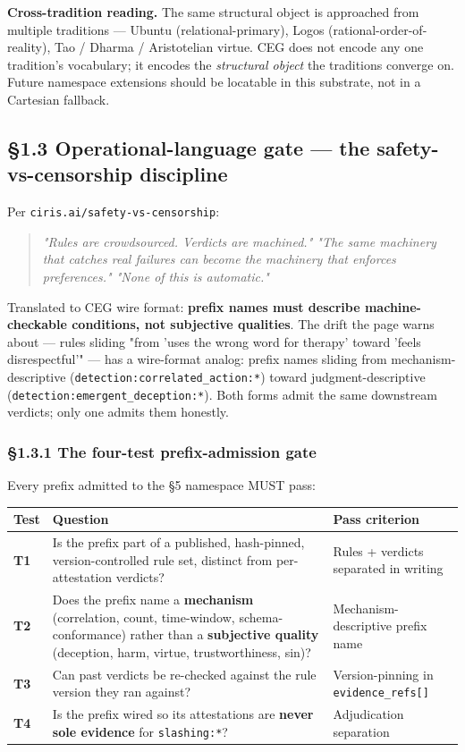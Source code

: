 \documentclass[10pt]{article}
\begin{document}
\textbf{Cross-tradition reading.} The same structural object is approached from multiple traditions — Ubuntu (relational-primary), Logos (rational-order-of-reality), Tao / Dharma / Aristotelian virtue. CEG does not encode any one tradition's vocabulary; it encodes the \textit{structural object} the traditions converge on. Future namespace extensions should be locatable in this substrate, not in a Cartesian fallback.


\subsection*{§1.3 Operational-language gate — the safety-vs-censorship discipline}


Per \texttt{ciris.ai/safety-vs-censorship}:


\begin{quote}\itshape \textit{"Rules are crowdsourced. Verdicts are machined."} \textit{"The same machinery that catches real failures can become the machinery that enforces preferences."} \textit{"None of this is automatic."}\end{quote}


Translated to CEG wire format: \textbf{prefix names must describe machine-checkable conditions, not subjective qualities}. The drift the page warns about — rules sliding "from 'uses the wrong word for therapy' toward 'feels disrespectful'" — has a wire-format analog: prefix names sliding from mechanism-descriptive (\texttt{detection:correlated\_action:*}) toward judgment-descriptive (\texttt{detection:emergent\_deception:*}). Both forms admit the same downstream verdicts; only one admits them honestly.


\subsubsection*{§1.3.1 The four-test prefix-admission gate}


Every prefix admitted to the §5 namespace MUST pass:


{\footnotesize
\begin{longtable}{|p{5.33cm}|p{5.33cm}|p{5.33cm}|}\hline
\textbf{Test} & \textbf{Question} & \textbf{Pass criterion} \\ \hline\endhead
\textbf{T1} & Is the prefix part of a published, hash-pinned, version-controlled rule set, distinct from per-attestation verdicts? & Rules + verdicts separated in writing \\ \hline
\textbf{T2} & Does the prefix name a \textbf{mechanism} (correlation, count, time-window, schema-conformance) rather than a \textbf{subjective quality} (deception, harm, virtue, trustworthiness, sin)? & Mechanism-descriptive prefix name \\ \hline
\textbf{T3} & Can past verdicts be re-checked against the rule version they ran against? & Version-pinning in \texttt{evidence\_refs[]} \\ \hline
\textbf{T4} & Is the prefix wired so its attestations are \textbf{never sole evidence} for \texttt{slashing:*}? & Adjudication separation \\ \hline
\end{longtable}}
\end{document}
